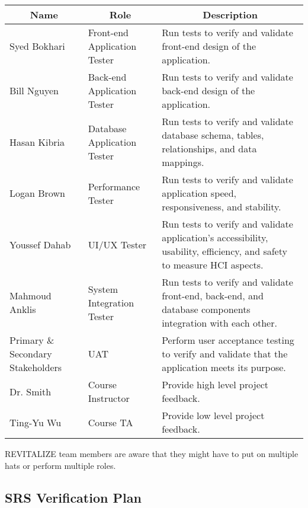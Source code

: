 \documentclass[12pt, titlepage]{article}
\begin{document}

\begin{table}[H]
	\centering
	\begin{tabular}{|p{3cm}|p{4cm}|p{7cm}|}
		\hline
		\multicolumn{1}{|c|}{\textbf{Name}} & \multicolumn{1}{|c|}{\textbf{Role}} & \multicolumn{1}{|c|}{\textbf{Description}}
		\\ \hline
		Syed Bokhari & Front-end Application Tester & Run tests to verify and validate front-end design of the application.
		\\ \hline
		Bill Nguyen & Back-end Application Tester & Run tests to verify and validate back-end design of the application.
		\\ \hline
		Hasan Kibria & Database Application Tester & Run tests to verify and validate database schema, tables, relationships, and data mappings. 
		\\ \hline
		Logan Brown & Performance Tester & Run tests to verify and validate application speed, responsiveness, and stability.
		\\ \hline
		Youssef Dahab & UI/UX Tester & Run tests to verify and validate application's accessibility, usability, efficiency, and safety to measure HCI aspects.
		\\ \hline  
		Mahmoud Anklis & System Integration Tester & Run tests to verify and validate front-end, back-end, and database components integration with each other.
		\\ \hline
		Primary \& Secondary Stakeholders & UAT & Perform user acceptance testing to verify and validate that the application meets its purpose.
		\\ \hline
		Dr. Smith & Course Instructor & Provide high level project feedback.
		\\ \hline
		Ting-Yu Wu & Course TA & Provide low level project feedback.
		\\ \hline
	\end{tabular}
\end{table}

REVITALIZE team members are aware that they might have to put on multiple hats or perform multiple roles.

\subsection{SRS Verification Plan}
\end{document}
